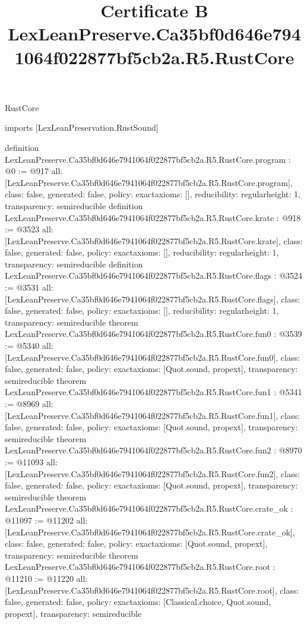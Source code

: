 \begin{lexlean}{RustCore}
\title{Certificate B LexLeanPreserve.Ca35bf0d646e7941064f022877bf5cb2a.R5.RustCore}
\begin{coremodule}
imports [LexLeanPreservation.RustSound]

definition LexLeanPreserve.Ca35bf0d646e7941064f022877bf5cb2a.R5.RustCore.program : @0 := @917 {
  all: [LexLeanPreserve.Ca35bf0d646e7941064f022877bf5cb2a.R5.RustCore.program],
  class: false,
  generated: false,
  policy: exact{axioms: []},
  reducibility: regular{height: 1},
  transparency: semireducible
}
definition LexLeanPreserve.Ca35bf0d646e7941064f022877bf5cb2a.R5.RustCore.krate : @918 := @3523 {
  all: [LexLeanPreserve.Ca35bf0d646e7941064f022877bf5cb2a.R5.RustCore.krate],
  class: false,
  generated: false,
  policy: exact{axioms: []},
  reducibility: regular{height: 1},
  transparency: semireducible
}
definition LexLeanPreserve.Ca35bf0d646e7941064f022877bf5cb2a.R5.RustCore.flags : @3524 := @3531 {
  all: [LexLeanPreserve.Ca35bf0d646e7941064f022877bf5cb2a.R5.RustCore.flags],
  class: false,
  generated: false,
  policy: exact{axioms: []},
  reducibility: regular{height: 1},
  transparency: semireducible
}
theorem LexLeanPreserve.Ca35bf0d646e7941064f022877bf5cb2a.R5.RustCore.fun0 : @3539 := @5340 {
  all: [LexLeanPreserve.Ca35bf0d646e7941064f022877bf5cb2a.R5.RustCore.fun0],
  class: false,
  generated: false,
  policy: exact{axioms: [Quot.sound, propext]},
  transparency: semireducible
}
theorem LexLeanPreserve.Ca35bf0d646e7941064f022877bf5cb2a.R5.RustCore.fun1 : @5341 := @8969 {
  all: [LexLeanPreserve.Ca35bf0d646e7941064f022877bf5cb2a.R5.RustCore.fun1],
  class: false,
  generated: false,
  policy: exact{axioms: [Quot.sound, propext]},
  transparency: semireducible
}
theorem LexLeanPreserve.Ca35bf0d646e7941064f022877bf5cb2a.R5.RustCore.fun2 : @8970 := @11093 {
  all: [LexLeanPreserve.Ca35bf0d646e7941064f022877bf5cb2a.R5.RustCore.fun2],
  class: false,
  generated: false,
  policy: exact{axioms: [Quot.sound, propext]},
  transparency: semireducible
}
theorem LexLeanPreserve.Ca35bf0d646e7941064f022877bf5cb2a.R5.RustCore.crate_ok : @11097 := @11202 {
  all: [LexLeanPreserve.Ca35bf0d646e7941064f022877bf5cb2a.R5.RustCore.crate_ok],
  class: false,
  generated: false,
  policy: exact{axioms: [Quot.sound, propext]},
  transparency: semireducible
}
theorem LexLeanPreserve.Ca35bf0d646e7941064f022877bf5cb2a.R5.RustCore.root : @11210 := @11220 {
  all: [LexLeanPreserve.Ca35bf0d646e7941064f022877bf5cb2a.R5.RustCore.root],
  class: false,
  generated: false,
  policy: exact{axioms: [Classical.choice, Quot.sound, propext]},
  transparency: semireducible
}


\end{coremodule}
\end{lexlean}
